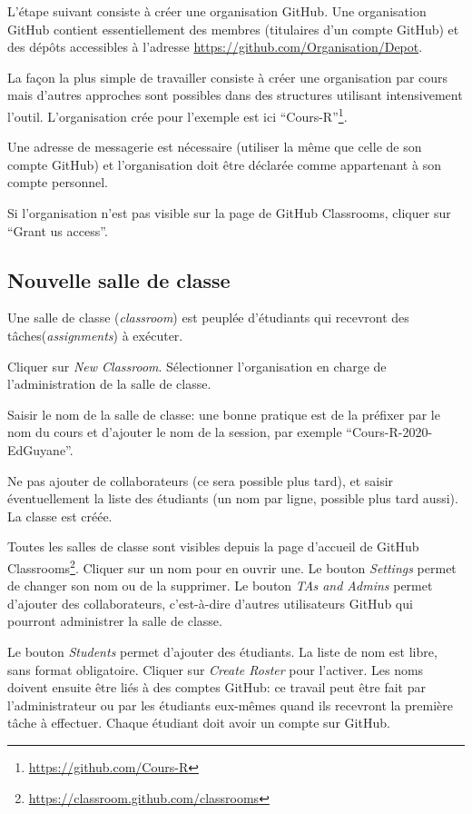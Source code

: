 \documentclass[
  11pt,
  french,
  a4paper,
  extrafontsizes,onecolumn,openright
  ]{memoir}
\begin{document}
L'étape suivant consiste à créer une organisation GitHub.
Une organisation GitHub contient essentiellement des membres (titulaires d'un compte GitHub) et des dépôts accessibles à l'adresse \url{https://github.com/Organisation/Depot}.

La façon la plus simple de travailler consiste à créer une organisation par cours mais d'autres approches sont possibles dans des structures utilisant intensivement l'outil.
L'organisation crée pour l'exemple est ici ``Cours-R''\footnote{\url{https://github.com/Cours-R}}.

Une adresse de messagerie est nécessaire (utiliser la même que celle de son compte GitHub) et l'organisation doit être déclarée comme appartenant à son compte personnel.

Si l'organisation n'est pas visible sur la page de GitHub Classrooms, cliquer sur ``Grant us access''.

\hypertarget{nouvelle-salle-de-classe}{%
\subsection{Nouvelle salle de classe}\label{nouvelle-salle-de-classe}}

Une salle de classe (\emph{classroom}) est peuplée d'étudiants qui recevront des tâches(\emph{assignments}) à exécuter.

Cliquer sur \emph{New Classroom}.
Sélectionner l'organisation en charge de l'administration de la salle de classe.

Saisir le nom de la salle de classe: une bonne pratique est de la préfixer par le nom du cours et d'ajouter le nom de la session, par exemple ``Cours-R-2020-EdGuyane''.

Ne pas ajouter de collaborateurs (ce sera possible plus tard), et saisir éventuellement la liste des étudiants (un nom par ligne, possible plus tard aussi).
La classe est créée.

Toutes les salles de classe sont visibles depuis la page d'accueil de GitHub Classrooms\footnote{\url{https://classroom.github.com/classrooms}}.
Cliquer sur un nom pour en ouvrir une.
Le bouton \emph{Settings} permet de changer son nom ou de la supprimer.
Le bouton \emph{TAs and Admins} permet d'ajouter des collaborateurs, c'est-à-dire d'autres utilisateurs GitHub qui pourront administrer la salle de classe.

Le bouton \emph{Students} permet d'ajouter des étudiants.
La liste de nom est libre, sans format obligatoire.
Cliquer sur \emph{Create Roster} pour l'activer.
Les noms doivent ensuite être liés à des comptes GitHub: ce travail peut être fait par l'administrateur ou par les étudiants eux-mêmes quand ils recevront la première tâche à effectuer.
Chaque étudiant doit avoir un compte sur GitHub.
\end{document}
